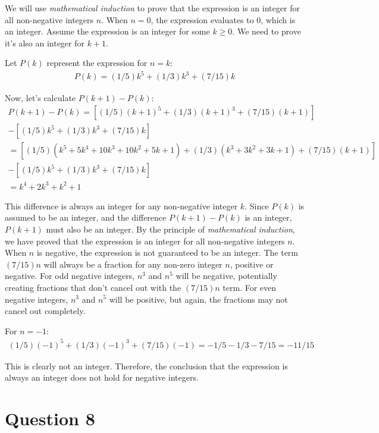 \documentclass[12pt]{article}
\begin{document}
We will use \textit{mathematical induction} to prove that the expression is an integer for all non-negative integers $n$.
When $n = 0$, the expression evaluates to 0, which is an integer.
Assume the expression is an integer for some $k \geq 0$. We need to prove it's also an integer for $k + 1$.

Let $P(k)$ represent the expression for $n = k$:
\begin{gather*}
    P(k) = (1/5)k^5 + (1/3)k^3 + (7/15)k
\end{gather*}

Now, let's calculate $P(k+1) - P(k)$:
\begin{gather*}
    P(k+1) - P(k) = [(1/5){(k+1)}^5 + (1/3){(k+1)}^3 + (7/15)(k+1)] \\
    - [(1/5)k^5 + (1/3)k^3 + (7/15)k] \\
    = [(1/5)(k^5 + 5k^4 + 10k^3 + 10k^2 + 5k + 1) + (1/3)(k^3 + 3k^2 + 3k + 1) + (7/15)(k+1)] \\
    - [(1/5)k^5 + (1/3)k^3 + (7/15)k] \\
    = k^4 + 2k^3 + k^2 + 1
\end{gather*}

This difference is always an integer for any non-negative integer $k$. Since $P(k)$ is assumed to be an integer, and the difference $P(k+1) - P(k)$ is an integer, $P(k+1)$ must also be an integer.
By the principle of \textit{mathematical induction}, we have proved that the expression is an integer for all non-negative integers $n$. \\

When $n$ is negative, the expression is not guaranteed to be an integer.
The term $(7/15)n$ will always be a fraction for any non-zero integer $n$, positive or negative.
For odd negative integers, $n^3$ and $n^5$ will be negative, potentially creating fractions that don't cancel out with the $(7/15)n$ term.
For even negative integers, $n^3$ and $n^5$ will be positive, but again, the fractions may not cancel out completely.

For $n = -1$:
\begin{gather*}
    (1/5){(-1)}^5 + (1/3){(-1)}^3 + (7/15)(-1) = -1/5 - 1/3 - 7/15 = -11/15
\end{gather*}

This is clearly not an integer. Therefore, the conclusion that the expression is always an integer does not hold for negative integers.

\section*{Question 8}
\end{document}

